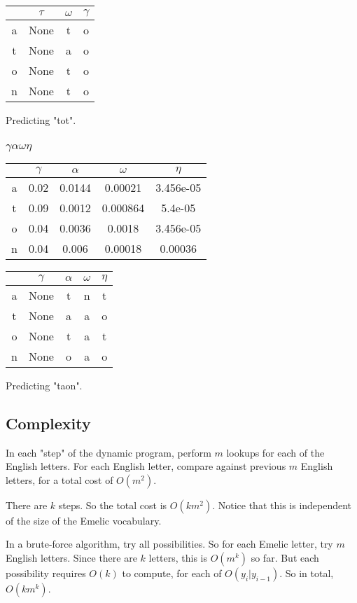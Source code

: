 \documentclass[]{article}
\begin{document}
\begin{tabular}{ |c|c|c|c| }
\hline
  & $\tau$ & $\omega$ & $\gamma$ \\
\hline
a & None & t & o \\
t & None & a & o \\
o & None & t & o \\
n & None & t & o \\
\hline
\end{tabular}

Predicting "tot".

\subsubsection{$\gamma \alpha \omega \eta$}

\begin{tabular}{ |c|c|c|c|c| }
\hline
  & $\gamma$ & $\alpha$ & $\omega$ & $\eta$\\
\hline
a & 0.02 & 0.0144 & 0.00021 & 3.456e-05 \\
t & 0.09 & 0.0012 & 0.000864 & 5.4e-05 \\
o & 0.04 & 0.0036 & 0.0018 & 3.456e-05 \\
n & 0.04 & 0.006 & 0.00018 & 0.00036 \\
\hline
\end{tabular}

\begin{tabular}{ |c|c|c|c|c| }
\hline
  & $\gamma$ & $\alpha$ & $\omega$ & $\eta$\\
\hline
a & None & t & n & t \\
t & None & a & a & o \\
o & None & t & a & t \\
n & None & o & a & o \\
\hline
\end{tabular}

Predicting "taon".

\subsection{Complexity}
In each "step" of the dynamic program, perform $m$ lookups for each of the English letters. For each English letter, compare against previous $m$ English letters, for a total cost of $O(m^2)$.

There are $k$ steps. So the total cost is $O(km^2)$. Notice that this is independent of the size of the Emelic vocabulary.

In a brute-force algorithm, try all possibilities. So for each Emelic letter, try $m$ English letters. Since there are $k$ letters, this is $O(m^k)$ so far. But each possibility requires $O(k)$ to compute, for each of $O(y_i|y_{i-1})$. So in total, $O(km^k)$.
\end{document}
